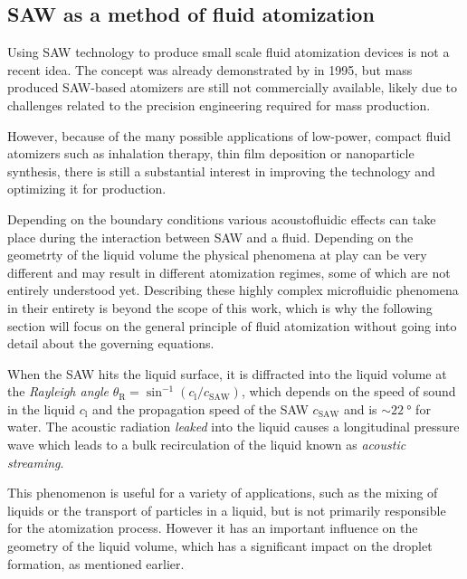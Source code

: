 \subsection{SAW as a method of fluid atomization}
\label{sec:saw_vapour}

Using SAW technology to produce small scale fluid atomization devices is not a recent idea. 
The concept was already demonstrated by \cite{kurosawaSurfaceAcousticWave1995} in 1995, but mass produced SAW-based atomizers are still not commercially available, likely due to challenges related to the precision engineering required for mass production.

However, because of the many possible applications of low-power, compact fluid atomizers such as inhalation therapy, thin film deposition or nanoparticle synthesis, there is still a substantial interest in improving the technology and optimizing it for production.

Depending on the boundary conditions various acoustofluidic effects can take place during the interaction between SAW and a fluid. \cite{winklerSAWbasedFluidAtomization2015a}
Depending on the geometrty of the liquid volume the physical phenomena at play can be very different and may result in different atomization regimes, some of which are not entirely understood yet. \cite{collinsAtomizationThinWater2012,huangExperimentalResearchSurface2022}
Describing these highly complex microfluidic phenomena in their entirety is beyond the scope of this work, which is why the following section will focus on the general principle of fluid atomization without going into detail about the governing equations.

When the SAW hits the liquid surface, it is diffracted into the liquid volume at the \emph{Rayleigh angle} $\theta_\text{R} = \sin^{-1}(c_\text{l}/c_\text{SAW})$, which depends on the speed of sound in the liquid $c_\text{l}$ and the propagation speed of the SAW $c_\text{SAW}$ and is $\sim\SI{22}{\degree}$ for water.
The acoustic radiation \emph{leaked} into the liquid causes a longitudinal pressure wave which leads to a bulk recirculation of the liquid known as \emph{acoustic streaming}.

This phenomenon is useful for a variety of applications, such as the mixing of liquids or the transport of particles in a liquid, but is not primarily responsible for the atomization process.
However it has an important influence on the geometry of the liquid volume, which has a significant impact on the droplet formation, as mentioned earlier.

